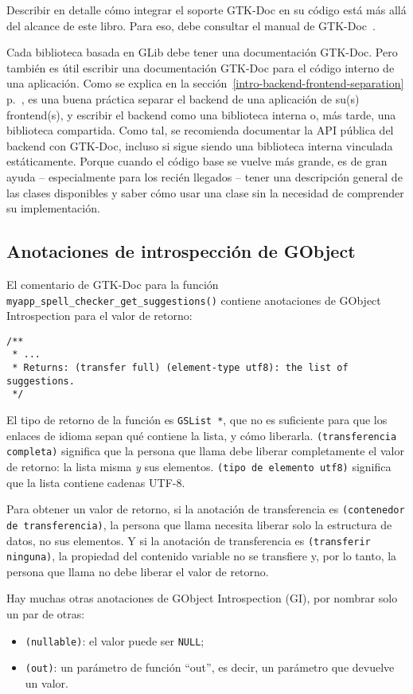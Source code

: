 Describir en detalle cómo integrar el soporte GTK-Doc en su código está más allá del alcance de este libro. Para eso, debe consultar el manual de GTK-Doc~\cite{gtk-doc}.

Cada biblioteca basada en GLib debe tener una documentación GTK-Doc. Pero también es útil escribir una documentación GTK-Doc para el código interno de una aplicación. Como se explica en la sección~\ref{intro-backend-frontend-separation} p.~\pageref{intro-backend-frontend-separation}, es una buena práctica separar el backend de una aplicación de su(s) frontend(s), y escribir el backend como una biblioteca interna o, más tarde, una biblioteca compartida. Como tal, se recomienda documentar la API pública del backend con GTK-Doc, incluso si sigue siendo una biblioteca interna vinculada estáticamente. Porque cuando el código base se vuelve más grande, es de gran ayuda -- especialmente para los recién llegados -- tener una descripción general de las clases disponibles y saber cómo usar una clase sin la necesidad de comprender su implementación.

\subsection{Anotaciones de introspección de GObject}
El comentario de GTK-Doc para la función \lstinline{myapp_spell_checker_get_suggestions()} contiene anotaciones de GObject Introspection para el valor de retorno:
\begin{lstlisting}
/**
 * ...
 * Returns: (transfer full) (element-type utf8): the list of suggestions.
 */
\end{lstlisting}

El tipo de retorno de la función es \lstinline{GSList *}, que no es suficiente para que los enlaces de idioma sepan qué contiene la lista, y cómo liberarla. \texttt{(transferencia completa)} significa que la persona que llama debe liberar completamente el valor de retorno: la lista misma \emph{y} sus elementos. \texttt{(tipo de elemento utf8)} significa que la lista contiene cadenas UTF-8.

Para obtener un valor de retorno, si la anotación de transferencia es \texttt{(contenedor de transferencia)}, la persona que llama necesita liberar solo la estructura de datos, no sus elementos. Y si la anotación de transferencia es \texttt{(transferir ninguna)}, la propiedad del contenido variable no se transfiere y, por lo tanto, la persona que llama no debe liberar el valor de retorno.

Hay muchas otras anotaciones de GObject Introspection (GI), por nombrar solo un par de otras:
\begin{itemize}
    \item \texttt{(nullable)}: el valor puede ser \lstinline{NULL};
    \item \texttt{(out)}: un parámetro de función ``out'', es decir, un parámetro que devuelve un valor.
\end{itemize}

